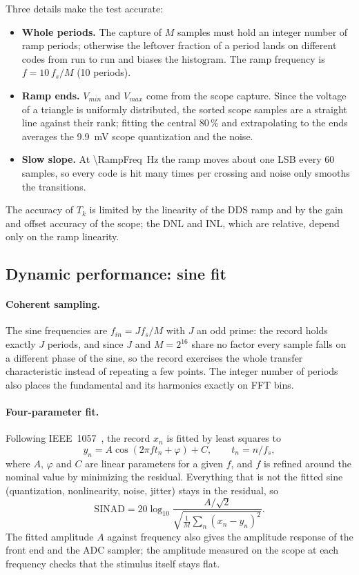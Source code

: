 Three details make the test accurate:
\begin{itemize}
  \item \textbf{Whole periods.} The capture of $M$ samples must hold an integer number of ramp
        periods; otherwise the leftover fraction of a period lands on different codes from run to
        run and biases the histogram. The ramp frequency is $f = 10\,f_s/M$ (10 periods).
  \item \textbf{Ramp ends.} $V_{min}$ and $V_{max}$ come from the scope capture. Since the
        voltage of a triangle is uniformly distributed, the sorted scope samples are a straight line
        against their rank; fitting the central 80\,\% and extrapolating to the ends averages the
        \SI{9.9}{mV} scope quantization and the noise.
  \item \textbf{Slow slope.} At \SI{\RampFreq}{Hz} the ramp moves about one LSB every 60 samples,
        so every code is hit many times per crossing and noise only smooths the transitions.
\end{itemize}
The accuracy of $T_k$ is limited by the linearity of the DDS ramp and by the gain and offset
accuracy of the scope; the DNL and INL, which are relative, depend only on the ramp linearity.

\subsection{Dynamic performance: sine fit}
\paragraph{Coherent sampling.} The sine frequencies are $f_{in} = J f_s / M$ with $J$ an odd
prime: the record holds exactly $J$ periods, and since $J$ and $M = 2^{16}$ share no factor every
sample falls on a different phase of the sine, so the record exercises the whole transfer
characteristic instead of repeating a few points. The integer number of periods also places the
fundamental and its harmonics exactly on FFT bins.

\paragraph{Four-parameter fit.} Following IEEE~1057~\cite{ieee1057}, the record $x_n$ is fitted by least squares to
\begin{equation}
y_n = A\cos(2\pi f t_n + \varphi) + C, \qquad t_n = n / f_s,
\end{equation}
where $A$, $\varphi$ and $C$ are linear parameters for a given $f$, and $f$ is refined around the
nominal value by minimizing the residual. Everything that is not the fitted sine (quantization,
nonlinearity, noise, jitter) stays in the residual, so
\begin{equation}
\text{SINAD} = 20\log_{10}\frac{A/\sqrt{2}}{\sqrt{\tfrac{1}{M}\sum_n (x_n - y_n)^2}}.
\end{equation}
The fitted amplitude $A$ against frequency also gives the amplitude response of the front end
and the ADC sampler; the amplitude measured on the scope at each frequency checks that the
stimulus itself stays flat.

